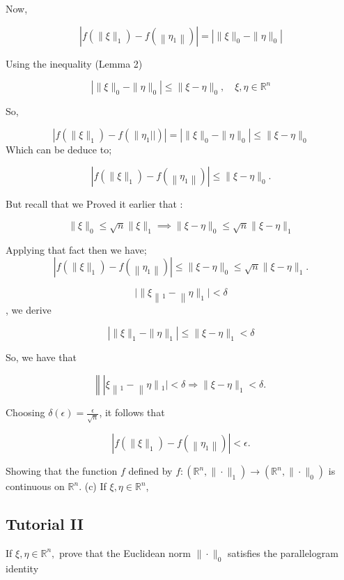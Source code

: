 \documentclass{article}
\begin{document}
Now,

$$
\left|f\left(\|\xi\|_{1}\right)-f\left(\left\|\eta_{1}\right\|\right)\right|=\left|\|\xi\|_{0}-\|\eta\|_{0}\right|
$$

Using the inequality  (Lemma 2)

$$
\left|\|\xi\|_{0}-\|\eta\|_{0}\right| \leq\|\xi-\eta\|_{0}, \quad \xi, \eta \in \mathbb{R}^{n}
$$

So, 

$$
\left|f\left(\|\xi\|_{1}\right)-f\left(\| \eta_{1}||\right)\right|=\left|\|\xi\|_{0}-\|\eta\|_{0}\right| \leq\|\xi-\eta\|_{0}
$$
Which can be deduce to;

$$
\left|f\left(\|\xi\|_{1}\right)-f\left(\left\|\eta_{1}\right\|\right)\right|\leq\|\xi-\eta\|_{0} .
$$

But recall that we Proved it earlier that :

$$\|\xi\|_{0} \leq \sqrt{n}\|\xi\|_{1} \implies  \|\xi-\eta\|_{0} \leq \sqrt{n}\|\xi-\eta\|_{1} $$

Applying that fact then we have;
$$
\left|f\left(\|\xi\|_{1}\right)-f\left(\left\|\eta_{1}\right\|\right)\right| \leq\|\xi-\eta\|_{0} \leq \sqrt{n}\|\xi-\eta\|_{1} .
$$

$$|\| \xi\left\|_{1}-\right\| \eta \|_{1} \mid<\delta$$, we derive

$$
\left|\|\xi\|_{1}-\|\eta\|_{1}\right| \leq\|\xi-\eta\|_{1}<\delta
$$

So, we have that

$$
\left\|\left|\xi\left\|_{1}-\right\| \eta\left\|_{1} \mid<\delta \Longrightarrow\right\| \xi-\eta \|_{1}<\delta\right.\right. \text {. }
$$

Choosing $\delta(\epsilon)=\frac{\epsilon}{\sqrt{n}}$, it follows that

$$
\left|f\left(\|\xi\|_{1}\right)-f\left(\left\|\eta_{1}\right\|\right)\right|<\epsilon .
$$

Showing that the function $f$ defined by $f:\left(\mathbb{R}^{n},\|\cdot\|_{1}\right) \longrightarrow\left(\mathbb{R}^{n},\|\cdot\|_{0}\right)$ is continuous on $\mathbb{R}^{n}$.
(c) If $\xi, \eta \in \mathbb{R}^{n}$,



\subsection{Tutorial II}
\large{}
If $\xi,\eta \in \mathbb{R}^n,$
prove that the Euclidean norm $\|\cdot\|_{0}$ satisfies the parallelogram identity
\end{document}

